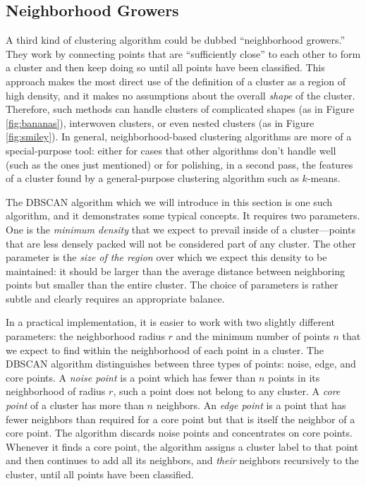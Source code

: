\subsection{Neighborhood Growers}

 
A third kind of clustering algorithm could be dubbed ``neighborhood
growers.'' They work by connecting points that are ``sufficiently
close'' to each other to form a cluster and then keep doing so until
all points have been classified. This approach makes the most direct
use of the definition of a cluster as a region of high density, and it
makes no assumptions about the overall \emph{shape} of the cluster.
Therefore, such methods can handle clusters of complicated shapes (as
in Figure \ref{fig:bananas}), interwoven clusters, or even nested
clusters (as in Figure \ref{fig:smiley}). In general,
neighborhood-based clustering algorithms are more of a special-purpose
tool: either for cases that other algorithms don't handle well (such
as the ones just mentioned) or for polishing, in a second pass, the
features of a cluster found by a general-purpose clustering algorithm
such as $k$-means.

The DBSCAN algorithm  which we will introduce in this section is one
such algorithm, and it demonstrates some typical concepts. It requires
two parameters. One is the \emph{minimum density} that we expect to
prevail inside of a cluster---points that are less densely packed will
not be considered part of any cluster. The other parameter is the
\emph{size of the region} over which we expect this density to be
maintained: it should be larger than the average distance between
neighboring points but smaller than the entire cluster.  The choice of
parameters is rather subtle and clearly requires an appropriate
balance.

In a practical implementation, it is easier to work with two slightly
different parameters: the neighborhood radius $r$ and the minimum
number of points $n$ that we expect to find within the neighborhood of
each point in a cluster. The DBSCAN algorithm distinguishes between
three types of points: noise, edge, and core points. A \emph{noise
  point} is a point which has fewer than $n$ points in its
neighborhood of radius $r$, such a point does not belong to any
cluster. A \emph{core point} of a cluster has more than $n$ neighbors.
An \emph{edge point} is a point that has fewer neighbors than required
for a core point but that is itself the neighbor of a core point.  The
algorithm discards noise points and concentrates on core points.
Whenever it finds a core point, the algorithm assigns a cluster label
to that point and then continues to add all its neighbors, and
\emph{their} neighbors recursively to the cluster, until all points
have been classified.


